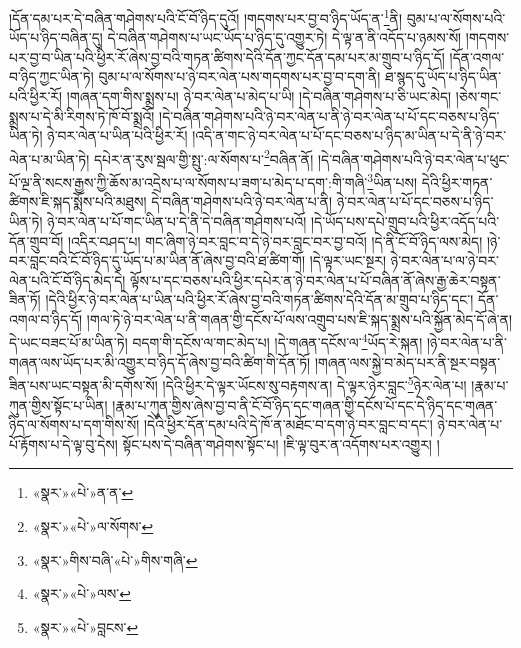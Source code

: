 །དོན་དམ་པར་དེ་བཞིན་གཤེགས་པའི་ངོ་བོ་ཉིད་དུའོ། །གདགས་པར་བྱ་བ་ཉིད་ཡོད་ན་\footnote{«སྣར་»«པེ་»ན་ན་}ནི། བུམ་པ་ལ་སོགས་པའི་ཡོད་པ་ཉིད་བཞིན་དུ། དེ་བཞིན་གཤེགས་པ་ཡང་ཡོད་པ་ཉིད་དུ་འགྱུར་ཏེ། དེ་ལྟ་ན་ནི་འདོད་པ་ཉམས་སོ། །གདགས་པར་བྱ་བ་ཡིན་པའི་ཕྱིར་རོ་ཞེས་བྱ་བའི་གཏན་ཚིགས་དེའི་དོན་ཀྱང་དོན་དམ་པར་མ་གྲུབ་པ་ཉིད་དོ། །དོན་འགལ་བ་ཉིད་ཀྱང་ཡིན་ཏེ། བུམ་པ་ལ་སོགས་པ་ཉེ་བར་ལེན་པས་གདགས་པར་བྱ་བ་དག་ནི། ཐ་སྙད་དུ་ཡོད་པ་ཉིད་ཡིན་པའི་ཕྱིར་རོ། །གཞན་དག་གིས་སྨྲས་པ། ཉེ་བར་ལེན་པ་མེད་པ་ཡི། །དེ་བཞིན་གཤེགས་པ་ཅི་ཡང་མེད། །ཅེས་གང་སྨྲས་པ་དེ་མི་རིགས་ཏེ་ཁོ་བོ་སྨྲའོ། །དེ་བཞིན་གཤེགས་པའི་ཉེ་བར་ལེན་པ་ནི་ཉེ་བར་ལེན་པ་པོ་དང་བཅས་པ་ཉིད་ཡིན་ཏེ། ཉེ་བར་ལེན་པ་ཡིན་པའི་ཕྱིར་རོ། །འདི་ན་གང་ཉེ་བར་ལེན་པ་པོ་དང་བཅས་པ་ཉིད་མ་ཡིན་པ་དེ་ནི་ཉེ་བར་ལེན་པ་མ་ཡིན་ཏེ། དཔེར་ན་རུས་སྦལ་གྱི་སྤུ་:ལ་སོགས་པ་\footnote{«སྣར་»«པེ་»ལ་སོགས་}བཞིན་ནོ། །དེ་བཞིན་གཤེགས་པའི་ཉེ་བར་ལེན་པ་ཕུང་པོ་ལྔ་ནི་སངས་རྒྱས་ཀྱི་ཆོས་མ་འདྲེས་པ་ལ་སོགས་པ་ཟག་པ་མེད་པ་དག་:གི་གཞི་\footnote{«སྣར་»གིས་བཞི་«པེ་»གིས་གཞི་}ཡིན་པས། དེའི་ཕྱིར་གཏན་ཚིགས་ཇི་སྐད་སྨོས་པའི་མཐུས། དེ་བཞིན་གཤེགས་པའི་ཉེ་བར་ལེན་པ་ནི། ཉེ་བར་ལེན་པ་པོ་དང་བཅས་པ་ཉིད་ཡིན་ཏེ། ཉེ་བར་ལེན་པ་པོ་གང་ཡིན་པ་དེ་ནི་དེ་བཞིན་གཤེགས་པའོ། །དེ་ཡོད་པས་དཔེ་གྲུབ་པའི་ཕྱིར་འདོད་པའི་དོན་གྲུབ་བོ། །འདིར་བཤད་པ། གང་ཞིག་ཉེ་བར་བླང་བ་དེ་ཉེ་བར་བླང་བར་བྱ་བའོ། །དེ་ནི་ངོ་བོ་ཉིད་ལས་མེད། །ཉེ་བར་བླང་བའི་ངོ་བོ་ཉིད་དུ་ཡོད་པ་མ་ཡིན་ནོ་ཞེས་བྱ་བའི་ཐ་ཚིག་གོ། །དེ་ལྟར་ཡང་སྔར། ཉེ་བར་ལེན་པ་ལ་ཉེ་བར་ལེན་པའི་ངོ་བོ་ཉིད་མེད་དེ། ལྟོས་པ་དང་བཅས་པའི་ཕྱིར་དཔེར་ན་ཉེ་བར་ལེན་པ་པོ་བཞིན་ནོ་ཞེས་རྒྱ་ཆེར་བསྟན་ཟིན་ཏོ། །དེའི་ཕྱིར་ཉེ་བར་ལེན་པ་ཡིན་པའི་ཕྱིར་རོ་ཞེས་བྱ་བའི་གཏན་ཚིགས་དེའི་དོན་མ་གྲུབ་པ་ཉིད་དང་། དོན་འགལ་བ་ཉིད་དོ། །གལ་ཏེ་ཉེ་བར་ལེན་པ་ནི་གཞན་གྱི་དངོས་པོ་ལས་འགྲུབ་པས་ཇི་སྐད་སྨྲས་པའི་སྐྱོན་མེད་དོ་ཞེ་ན། དེ་ཡང་བཟང་པོ་མ་ཡིན་ཏེ། བདག་གི་དངོས་ལ་གང་མེད་པ། །དེ་གཞན་དངོས་ལ་\footnote{«སྣར་»«པེ་»ལས་}ཡོད་རེ་སྐན། །ཉེ་བར་ལེན་པ་ནི་གཞན་ལས་ཡོད་པར་མི་འགྱུར་བ་ཉིད་དོ་ཞེས་བྱ་བའི་ཚིག་གི་དོན་ཏོ། །གཞན་ལས་སྐྱེ་བ་མེད་པར་ནི་སྔར་བསྟན་ཟིན་པས་ཡང་བསྟན་མི་དགོས་སོ། །དེའི་ཕྱིར་དེ་ལྟར་ཡོངས་སུ་བརྟགས་ན། དེ་ལྟར་ཉེར་བླང་\footnote{«སྣར་»«པེ་»བླངས་}ཉེར་ལེན་པ། །རྣམ་པ་ཀུན་གྱིས་སྟོང་པ་ཡིན། །རྣམ་པ་ཀུན་གྱིས་ཞེས་བྱ་བ་ནི་ངོ་བོ་ཉིད་དང་གཞན་གྱི་དངོས་པོ་དང་དེ་ཉིད་དང་གཞན་ཉིད་ལ་སོགས་པ་དག་གིས་སོ། །དེའི་ཕྱིར་དོན་དམ་པའི་དེ་ཁོ་ན་མཐོང་བ་དག་ཉེ་བར་བླང་བ་དང་། ཉེ་བར་ལེན་པ་པོ་རྟོགས་པ་དེ་ལྟ་བུ་དེས། སྟོང་པས་དེ་བཞིན་གཤེགས་སྟོང་པ། །ཇི་ལྟ་བུར་ན་འདོགས་པར་འགྱུར། །
